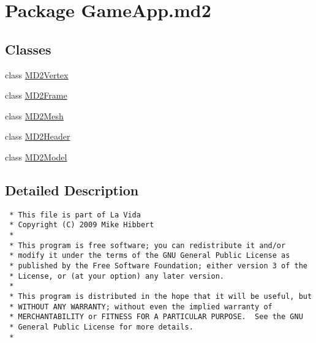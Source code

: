 \hypertarget{namespaceGameApp_1_1md2}{
\section{Package GameApp.md2}
\label{namespaceGameApp_1_1md2}
}


\subsection*{Classes}
\begin{CompactItemize}
\item 
class \hyperlink{classGameApp_1_1md2_1_1MD2Vertex}{MD2Vertex}
\item 
class \hyperlink{classGameApp_1_1md2_1_1MD2Frame}{MD2Frame}
\item 
class \hyperlink{classGameApp_1_1md2_1_1MD2Mesh}{MD2Mesh}
\item 
class \hyperlink{classGameApp_1_1md2_1_1MD2Header}{MD2Header}
\item 
class \hyperlink{classGameApp_1_1md2_1_1MD2Model}{MD2Model}
\end{CompactItemize}


\subsection{Detailed Description}


\footnotesize\begin{verbatim}
 * This file is part of La Vida
 * Copyright (C) 2009 Mike Hibbert
 *
 * This program is free software; you can redistribute it and/or
 * modify it under the terms of the GNU General Public License as
 * published by the Free Software Foundation; either version 3 of the
 * License, or (at your option) any later version.
 *
 * This program is distributed in the hope that it will be useful, but
 * WITHOUT ANY WARRANTY; without even the implied warranty of
 * MERCHANTABILITY or FITNESS FOR A PARTICULAR PURPOSE.  See the GNU
 * General Public License for more details.
 *
\end{verbatim}
\normalsize
 